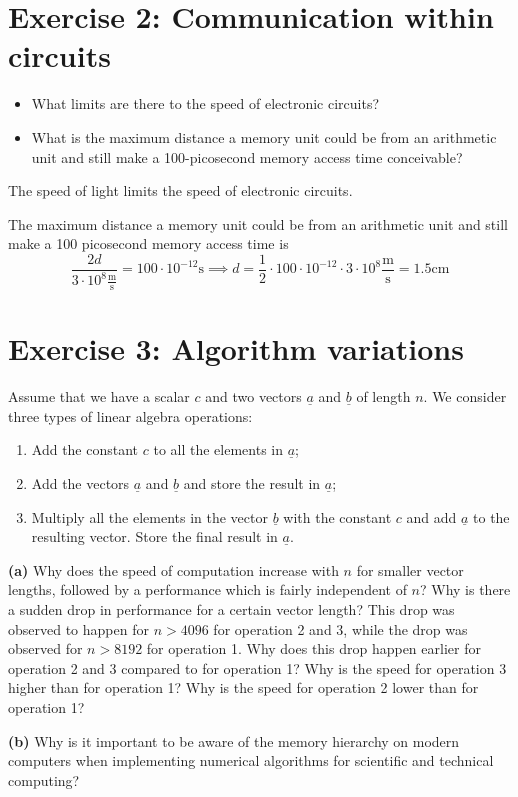\section{Exercise 2: Communication within circuits} %
\label{sec:exercise_2}
\begin{question}
  \begin{itemize}
    \item What limits are there to the speed of electronic circuits?
    \item What is the maximum distance a memory unit could be from an arithmetic unit and still make a 100-picosecond memory access time conceivable?
  \end{itemize}
\end{question}

The speed of light limits the speed of electronic circuits.

The maximum distance a memory unit could be from an arithmetic unit and still make a 100 picosecond memory access time is
\begin{equation}
  \frac{2d}{3\cdot 10^8 \mathrm{\frac{m}{s}}} = 100\cdot 10^{-12} \mathrm{s}
  \implies d =\frac{1}{2} \cdot 100 \cdot 10^{-12} \cdot 3\cdot 10^8 \mathrm{\frac{m}{s}} = 1.5 \mathrm{cm}
\end{equation}
\pagebreak


\section{Exercise 3: Algorithm variations} %
\label{sec:exercise_3_algorithm_variations}
\begin{question}
  Assume that we have a scalar $c$ and two vectors $\underline{a}$ and $\underline{b}$ of length $n$. We consider three types of linear algebra operations:
  \begin{enumerate}
    \item Add the constant $c$ to all the elements in $\underline{a}$;
    \item Add the vectors $\underline{a}$ and $\underline{b}$ and store the result in $\underline{a}$;
    \item Multiply all the elements in the vector $\underline{b}$ with the constant $c$ and add $\underline{a}$ to the resulting vector. Store the final result in $\underline{a}$.
  \end{enumerate}

  \textbf{(a)} Why does the speed of computation increase with $n$ for smaller vector lengths, followed by a performance which is fairly independent of $n$? Why is there a sudden drop in performance for a certain vector length? This drop was observed to happen for $n>4096$ for operation 2 and 3, while the drop was observed for $n>8192$ for operation 1. Why does this drop happen earlier for operation 2 and 3 compared to for operation 1? Why is the speed for operation 3 higher than for operation 1? Why is the speed for operation 2 lower than for operation 1?

  \textbf{(b)} Why is it important to be aware of the memory hierarchy on modern computers when implementing numerical algorithms for scientific and technical computing?
\end{question}

